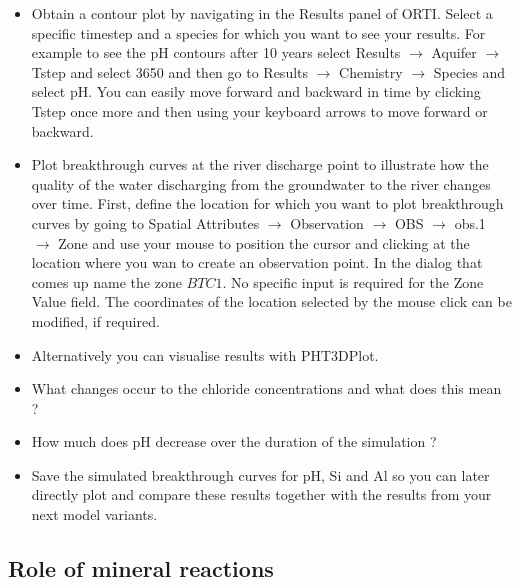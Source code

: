 \begin{itemize}

\item Obtain a contour plot by navigating in the {\color{blue} Results} panel of ORTI.
Select a specific timestep and a species for which you want to see your results.
For example to see the pH contours after 10 years select {\color{blue}Results} $\rightarrow$ {\color{blue}Aquifer} 
$\rightarrow$ {\color{blue}Tstep} and select {\color{blue}3650} and then go to   
{\color{blue}Results} $\rightarrow$ {\color{blue}Chemistry} 
$\rightarrow$ {\color{blue}Species} and select {\color{blue}pH}.  
You can easily move forward and backward in time by clicking {\color{blue}Tstep} once more and then
using your keyboard arrows to move forward or backward.

\item Plot breakthrough curves at the river discharge point to illustrate how the quality of the
water discharging from the groundwater to the river changes over time.
First, define the location for which you want to plot breakthrough curves by
going to {\color{blue}Spatial Attributes} $\rightarrow$ {\color{blue}Observation} $\rightarrow$ {\color{blue}OBS} $\rightarrow$ {\color{blue}obs.1} $\rightarrow$ {\color{blue}Zone}
and use your mouse to position the cursor and clicking at the location
where you wan to create an observation point. In the dialog that comes up name the zone $BTC1$. 
No specific input is required for the {\color{blue}Zone Value} field.
The coordinates of the location selected by the mouse click can be modified, if required.

\item Alternatively you can visualise results with PHT3DPlot. 

\item What changes occur to the chloride concentrations and what does this mean ?

\item How much does pH decrease over the duration of the simulation ? 

\item Save the simulated breakthrough curves for pH, Si and Al so you can later directly 
plot and compare these results together with the results from your next model variants.  
 
\end{itemize}



\subsection[Role of mineral reactions]{Role of mineral reactions}

